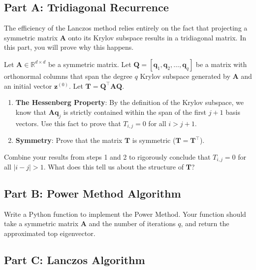 \documentclass{article}
\begin{document}
\hypertarget{part-a-tridiagonal-recurrence}{%
\subsection*{Part A: Tridiagonal Recurrence}\label{part-a-tridiagonal-recurrence}}

The efficiency of the Lanczos method relies entirely on the fact that projecting a symmetric matrix \(\mathbf{A}\) onto its Krylov subspace results in a tridiagonal matrix. In this part, you will prove why this happens.

Let \(\mathbf{A} \in \mathbb{R}^{d \times d}\) be a symmetric matrix. Let \(\mathbf{Q} = [\mathbf{q}_1, \mathbf{q}_2, \dots, \mathbf{q}_q]\) be a matrix with orthonormal columns that span the degree \(q\) Krylov subspace generated by \(\mathbf{A}\) and an initial vector \(\mathbf{z}^{(0)}\). Let \(\mathbf{T} = \mathbf{Q}^\top \mathbf{A} \mathbf{Q}\).

\begin{enumerate}
\def\labelenumi{\arabic{enumi}.}
\item
  \textbf{The Hessenberg Property}: By the definition of the Krylov subspace, we know that \(\mathbf{A}\mathbf{q}_j\) is strictly contained within the span of the first \(j+1\) basis vectors. Use this fact to prove that \(T_{i,j} = 0\) for all \(i > j + 1\).
\item
  \textbf{Symmetry}: Prove that the matrix \(\mathbf{T}\) is symmetric (\(\mathbf{T} = \mathbf{T}^\top\)).
\end{enumerate}

Combine your results from steps 1 and 2 to rigorously conclude that \(T_{i,j} = 0\) for all \(|i - j| > 1\). What does this tell us about the structure of \(\mathbf{T}\)?

\hypertarget{part-b-power-method-algorithm}{%
\subsection*{Part B: Power Method Algorithm}\label{part-b-power-method-algorithm}}

Write a Python function to implement the Power Method. Your function should take a symmetric matrix \(\mathbf{A}\) and the number of iterations \(q\), and return the approximated top eigenvector.

\hypertarget{part-c-lanczos-algorithm}{%
\subsection*{Part C: Lanczos Algorithm}\label{part-c-lanczos-algorithm}}
\end{document}

